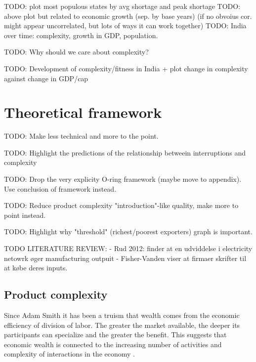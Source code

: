 \documentclass[11pt]{article}
\begin{document}
TODO: plot most populous states by avg shortage and peak shortage
TODO: above plot but related to economic growth (sep. by base years) (if no obvoius cor. might appear uncorrelated, but lots of ways it can work together)
TODO: India over time: complexity, growth in GDP, population.

TODO: Why should we care about complexity?

TODO: Development of complexity/fitness in India + plot change in complexity against change in GDP/cap



\section{Theoretical framework}%
\label{sec:framework}

TODO: Make less technical and more to the point.

TODO: Highlight the predictions of the relationship betweein interruptions and complexity

TODO: Drop the very explicity O-ring framework (maybe move to appendix). Use conclusion of framework instead.

TODO: Reduce product complexity "introduction"-like quality, make more to point instead.

TODO: Highlight why "threshold" (richest/poorest exporters) graph is important.


TODO LITERATURE REVIEW:
- Rud 2012: finder at en udviddelse i electricity netowrk øger manufacturing outpuit
- Fisher-Vanden viser at firmaer skrifter til at købe deres inputs. 

\subsection{Product complexity}
\label{sec:frame-product-complexity}

Since Adam Smith it has been a truism that wealth comes from the economic efficiency of division of labor. The greater the market available, the deeper its participants can specialize and the greater the benefit. This suggests that economic wealth is connected to the increasing number of activities and complexity of interactions in the economy \citep{romer_endogenous_1990}.
\end{document}
